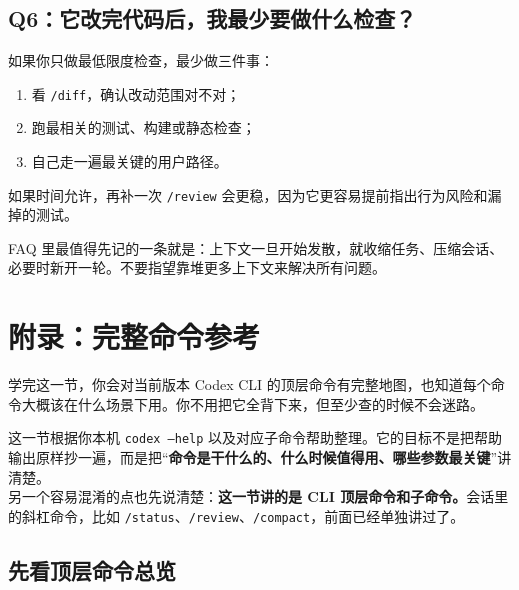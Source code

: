 \documentclass[UTF8,a4paper,12pt]{ctexart}
\begin{document}
\subsection{Q6：它改完代码后，我最少要做什么检查？}

如果你只做最低限度检查，最少做三件事：
\begin{enumerate}
  \item 看 \texttt{/diff}，确认改动范围对不对；
  \item 跑最相关的测试、构建或静态检查；
  \item 自己走一遍最关键的用户路径。
\end{enumerate}

如果时间允许，再补一次 \texttt{/review} 会更稳，因为它更容易提前指出行为风险和漏掉的测试。

\begin{sumbox}
FAQ 里最值得先记的一条就是：上下文一旦开始发散，就收缩任务、压缩会话、必要时新开一轮。不要指望靠堆更多上下文来解决所有问题。
\end{sumbox}

\section{附录：完整命令参考}

\begin{learnbox}
学完这一节，你会对当前版本 Codex CLI 的顶层命令有完整地图，也知道每个命令大概该在什么场景下用。你不用把它全背下来，但至少查的时候不会迷路。
\end{learnbox}

这一节根据你本机 \texttt{codex --help} 以及对应子命令帮助整理。它的目标不是把帮助输出原样抄一遍，而是把“\textbf{命令是干什么的、什么时候值得用、哪些参数最关键}”讲清楚。\\
另一个容易混淆的点也先说清楚：\textbf{这一节讲的是 CLI 顶层命令和子命令。}会话里的斜杠命令，比如 \texttt{/status}、\texttt{/review}、\texttt{/compact}，前面已经单独讲过了。

\subsection{先看顶层命令总览}
\end{document}
